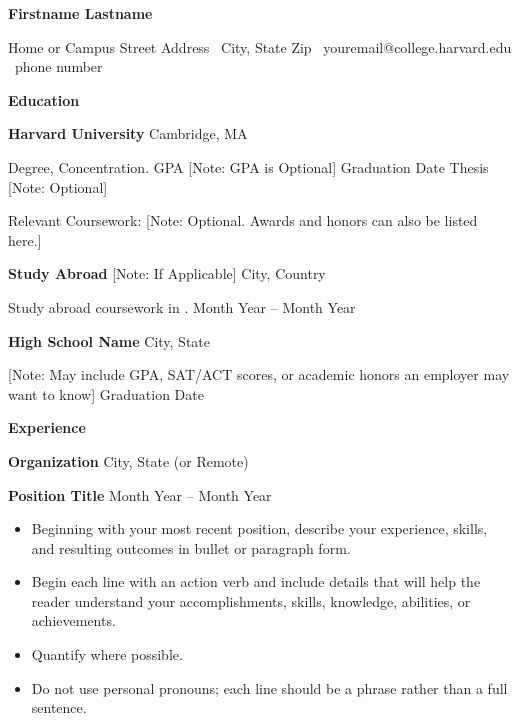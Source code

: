 \documentclass[11pt]{article}
\begin{document}
\begin{center}
    \textbf{Firstname Lastname}\\
    \hrulefill
\end{center}

\begin{center}
    Home or Campus Street Address \textbullet \ City, State Zip \textbullet \ youremail@college.harvard.edu \textbullet \ phone number
\end{center}

\vspace{0.5pt}

\begin{center}
    \textbf{Education}
\end{center}
\textbf{Harvard University} \hfill Cambridge, MA

Degree, Concentration. GPA [Note: GPA is Optional] \hfill Graduation Date Thesis [Note: Optional]

Relevant Coursework: [Note: Optional. Awards and honors can also be listed here.]

\vspace{12pt}

\textbf{Study Abroad} [Note: If Applicable] \hfill City, Country

Study abroad coursework in   . \hfill    Month Year – Month Year

\vspace{12pt}

\textbf{High School Name} \hfill    City, State

[Note: May include GPA, SAT/ACT scores, or academic honors an employer may want to know] \hfill Graduation Date

\vspace{12pt}

\begin{center}
    \textbf{Experience}
\end{center}
\textbf{Organization} \hfill City, State (or Remote)

\textbf{Position Title} \hfill Month Year – Month Year
\begin{itemize}[noitemsep, topsep=0pt, partopsep=0pt, parsep=0pt]
    \item Beginning with your most recent position, describe your experience, skills, and resulting outcomes in bullet or paragraph form.
    \item Begin each line with an action verb and include details that will help the reader understand your accomplishments, skills, knowledge, abilities, or achievements.
    \item Quantify where possible.
    \item Do not use personal pronouns; each line should be a phrase rather than a full sentence.
\end{itemize}
\end{document}
